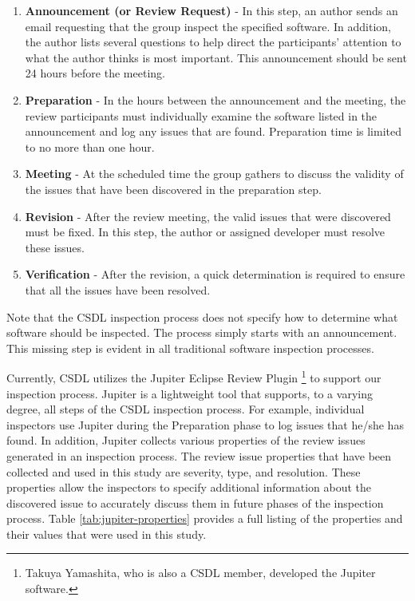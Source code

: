 \begin{enumerate}
\item \textbf{Announcement (or Review Request)} - In this step, an author
  sends an email requesting that the group inspect the specified software.
  In addition, the author lists several questions to help direct the
  participants' attention to what the author thinks is most important. This
  announcement should be sent 24 hours before the meeting.
\item \textbf{Preparation} - In the hours between the announcement and the
  meeting, the review participants must individually examine the software
  listed in the announcement and log any issues that are found. Preparation
  time is limited to no more than one hour.
\item \textbf{Meeting} - At the scheduled time the group gathers to discuss
  the validity of the issues that have been discovered in the preparation
  step.
\item \textbf{Revision} - After the review meeting, the valid issues that
  were discovered must be fixed. In this step, the author or assigned
  developer must resolve these issues.
\item \textbf{Verification} - After the revision, a quick determination is
  required to ensure that all the issues have been resolved.
\end{enumerate}

Note that the CSDL inspection process does not specify how to determine
what software should be inspected. The process simply starts with an
announcement. This missing step is evident in all traditional software
inspection processes. 

Currently, CSDL utilizes the Jupiter Eclipse Review Plugin \footnote{
  Takuya Yamashita, who is also a CSDL member, developed the Jupiter
  software.} \cite{Jupiter} to support our inspection process. Jupiter is a
lightweight tool that supports, to a varying degree, all steps of the CSDL
inspection process.  For example, individual inspectors use Jupiter during
the Preparation phase to log issues that he/she has found. In addition,
Jupiter collects various properties of the review issues generated in an
inspection process. The review issue properties that have been collected
and used in this study are severity, type, and resolution. These properties
allow the inspectors to specify additional information about the discovered
issue to accurately discuss them in future phases of the inspection
process. Table \ref{tab:jupiter-properties} provides a full listing of the
properties and their values that were used in this study.

